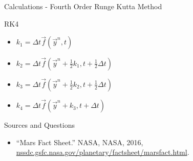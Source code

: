 \documentclass{beamer}  %
\begin{document}
\begin{frame}{Calculations - Fourth Order Runge Kutta Method}

  \begin{block}{RK4} %
    \begin{itemize}
      \item $k_{1}= \Delta t\vec{f}(\vec{y}^{n},t)$
      \item $k_{2}= \Delta t\vec{f}(\vec{y}^{n} + \frac{1}{2}k_{1},t + \frac{1}{2}\Delta t)$
      \item $k_{3}= \Delta t\vec{f}(\vec{y}^{n} + \frac{1}{2}k_{2},t + \frac{1}{2}\Delta t)$
      \item $k_{4}= \Delta t\vec{f}(\vec{y}^{n} + k_{3}, t + \Delta t)$
    \end{itemize}
  \end{block}

\end{frame}

\begin{frame}{Sources and Questions}

\begin{itemize}
	\item “Mars Fact Sheet.” NASA, NASA, 2016, \url{nssdc.gsfc.nasa.gov/planetary/factsheet/marsfact.html}.
\end{itemize}

\end{frame}
\end{document}
